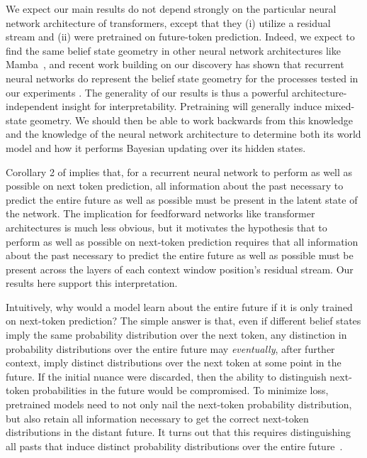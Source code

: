 \documentclass{article}
\begin{document}

We expect our main results do not depend strongly on the particular neural network architecture of transformers, except that they (i) utilize a residual stream and (ii) were pretrained on future-token prediction.
Indeed, we expect to find the same belief state geometry in other neural network architectures like Mamba~\citep{Gu23_Mamba}, and recent work building on our discovery has shown that recurrent neural networks do represent the belief state geometry for the processes tested in our experiments \cite{rnn_belief}.
The generality of our results is thus a powerful architecture-independent insight for interpretability.  Pretraining will generally induce mixed-state geometry.  We should then be able to work backwards from this knowledge and the knowledge of the neural network architecture to determine both its world model and how it performs Bayesian updating over its hidden states.


Corollary 2 of \cite{Shal98a} implies that, for a recurrent neural network to perform as well as possible on next token prediction, all information about the past necessary to predict the 
entire future as well as possible 
must be present in the latent state of the network.  The implication for feedforward networks like transformer architectures is much less obvious, but it 
motivates the hypothesis
that
to perform as well as possible on next-token prediction requires that all information about the past necessary to predict the entire future as well as possible must be present across the layers of each context window position's residual stream.  Our results here support this interpretation.

Intuitively, why would a model learn about the entire future if it is only trained on next-token prediction?
The simple answer is that, even if different belief states imply the same probability distribution over the next token, 
any distinction in probability distributions over the entire future
may \emph{eventually}, after further context, imply distinct distributions over the next token at some point in the future.  If the initial nuance were discarded, then the ability to distinguish next-token probabilities in the future would be compromised.
To minimize loss, pretrained models need to not only nail the next-token probability distribution, but also retain all information necessary to get the correct next-token distributions in the distant future.  It turns out that this requires distinguishing all pasts that induce distinct probability distributions over the entire future~\citep{Shal98a}.
\end{document}
